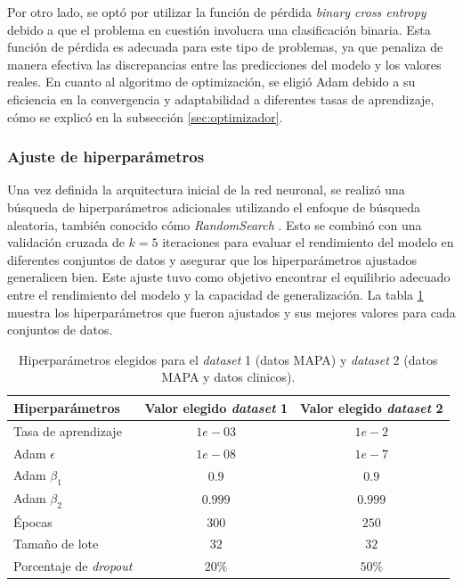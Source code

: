  Por otro lado, se optó por utilizar la función de pérdida \emph{binary cross entropy} debido a 
 que el problema en cuestión involucra una clasificación binaria. Esta función de pérdida es 
 adecuada para este tipo de problemas, ya que penaliza de manera efectiva las discrepancias 
 entre las predicciones del modelo y los valores reales. En cuanto al algoritmo de optimización, 
 se eligió Adam debido a su eficiencia en la convergencia y adaptabilidad a diferentes tasas de 
 aprendizaje, cómo se explicó en la subsección \ref{sec:optimizador}.

\subsubsection{Ajuste de hiperparámetros}

Una vez definida la arquitectura inicial de la red neuronal, se realizó una búsqueda de hiperparámetros 
adicionales utilizando el enfoque de búsqueda aleatoria, también conocido cómo \emph{RandomSearch} \citep{CITE:50}. 
Esto se combinó con una validación cruzada de $k=5$ iteraciones para evaluar el rendimiento del modelo en diferentes 
conjuntos de datos y asegurar que los hiperparámetros ajustados generalicen bien. Este ajuste tuvo como objetivo 
encontrar el equilibrio adecuado entre el rendimiento del modelo y la capacidad de generalización. 
La tabla \ref{tab:Tabla1} muestra los hiperparámetros que fueron ajustados y sus mejores valores 
para cada conjuntos de datos.

\begin{table}[H]
	\centering
	\caption{Hiperparámetros elegidos para el \emph{dataset} 1 (datos MAPA) y \emph{dataset} 2 (datos MAPA y datos clinicos).}
	\begin{tabular}{l c c}    
		\toprule
		\textbf{Hiperparámetros} 	      & \textbf{Valor elegido \emph{dataset} 1} 	& \textbf{Valor elegido \emph{dataset} 2}  \\
		\midrule
    Tasa de aprendizaje            & $1e-03$                   & $1e-2$\\		
    Adam $\epsilon$                   & $1e-08$                 & $1e-7$\\	
    Adam $\beta_1$                   & $0.9$                 & $0.9$\\	
    Adam $\beta_2$                   & $0.999$                 & $0.999$\\		
    Épocas                  & $300$                 & $250$\\	
    Tamaño de lote                  & $32$                 & $32$\\		
    Porcentaje de \emph{dropout}                 & $20\%$                 & $50\%$\\	

		\bottomrule
		\hline
	\end{tabular}
	\label{tab:Tabla1}
\end{table}


